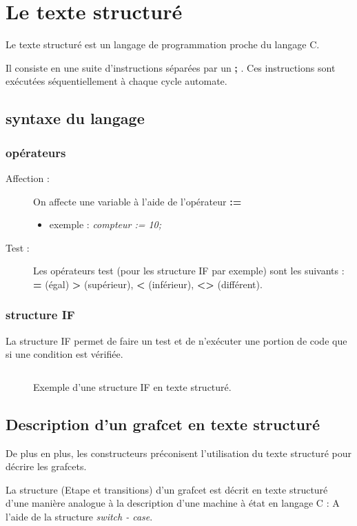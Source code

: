 \section{Le texte structuré}
Le texte structuré est un langage de programmation proche du langage C.

Il consiste en une suite d'instructions séparées par un \textbf{;} . Ces instructions sont exécutées séquentiellement à chaque cycle automate.

\subsection{syntaxe du langage}
\subsubsection{opérateurs}
\begin{description}
  \item [Affection : ] On affecte une variable à l'aide de l'opérateur \textbf{:=}
    \begin{itemize}
      \item exemple : \textit{compteur := 10;}
    \end{itemize}
  \item [Test : ] Les opérateurs test (pour les structure IF par exemple) sont les suivants : \textbf{=} (égal) \textbf{>} (supérieur), \textbf{<} (inférieur), \textbf{<>} (différent).
\end{description}

\subsubsection{structure IF}
La structure IF permet de faire un test et de n'exécuter une portion de code que si une condition est vérifiée.
\begin{figure}[ht]
  \inputminted{C}{texteStructure/structureIF.c}
  \caption{Exemple d'une structure IF en texte structuré.}
\end{figure}

\subsection{Description d'un grafcet en texte structuré}

De plus en plus, les constructeurs préconisent l'utilisation du texte structuré pour décrire les grafcets.

La structure (Etape et transitions) d'un grafcet est décrit en texte structuré d'une manière analogue à la description d'une machine à état en langage C : A l'aide de la structure \textit{switch - case}.

